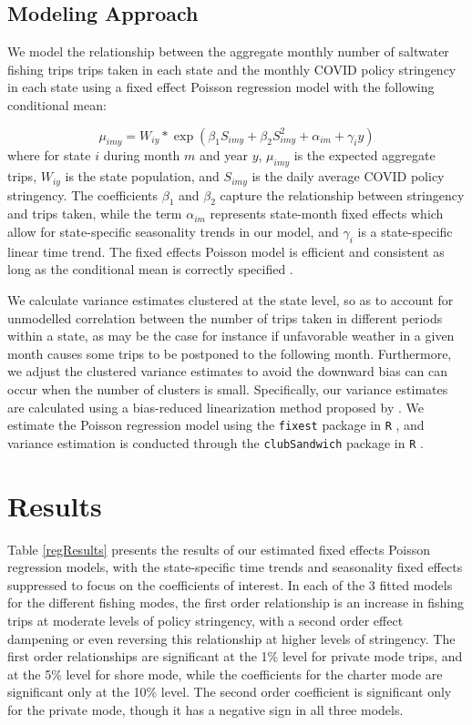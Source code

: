 \documentclass[12pt]{article}
\begin{document}
\subsection{Modeling Approach}

We model the relationship between the aggregate monthly number of
saltwater fishing trips trips taken in each state and the monthly COVID
policy stringency in each state using a fixed effect Poisson regression model with the
following conditional mean:

\[\mu_{imy} = W_{iy}*\exp(\beta_1 S_{imy} + \beta_2 S_{imy}^2 + \alpha_{im} + \gamma_i y)\]
where for state \(i\) during month \(m\) and year \(y\), \(\mu_{imy}\)
is the expected aggregate trips, \(W_{iy}\) is the state population, and
\(S_{imy}\) is the daily average COVID policy stringency. The
coefficients \(\beta_1\) and \(\beta_2\) capture the 
relationship between stringency and trips taken, while the term
\(\alpha_{im}\) represents state-month fixed effects which allow for
state-specific seasonality trends in our model, and \(\gamma_i\) is a
state-specific linear time trend. The fixed effects Poisson model is efficient and consistent as long as the conditional mean is correctly specified \citep{wooldridge2010econometric}.

We calculate variance estimates clustered at the state level, so as to
account for unmodelled correlation between the number of trips taken in
different periods within a state, as may be the case for instance if
unfavorable weather in a given month causes some trips to be postponed
to the following month. Furthermore, we adjust the clustered variance estimates
to avoid the downward bias can can occur when the number of clusters is small. Specifically, our variance estimates are calculated
using a bias-reduced linearization method proposed by \citet{bell2002bias}. We estimate the Poisson regression model using the
\texttt{fixest} package in \texttt{R} \citep{berge2018Efficient}, and variance
estimation is conducted through the \texttt{clubSandwich} package in
\texttt{R}  \citep{pustejovsky2016Small}.

\section{Results}

Table \ref{regResults} presents the results of our estimated fixed
effects Poisson regression models, with the state-specific time trends
and seasonality fixed effects suppressed to focus on the coefficients of
interest. In each of the 3 fitted models for the different fishing
modes, the first order relationship is an increase in fishing trips at
moderate levels of policy stringency, with a second order effect
dampening or even reversing this relationship at higher levels of
stringency. The first order relationships are significant at the 1\%
level for private mode trips, and at the 5\% level for shore mode, while
the coefficients for the charter mode are significant only at the 10\%
level. The second order coefficient is significant only for the private
mode, though it has a negative sign in all three models.
\end{document}

